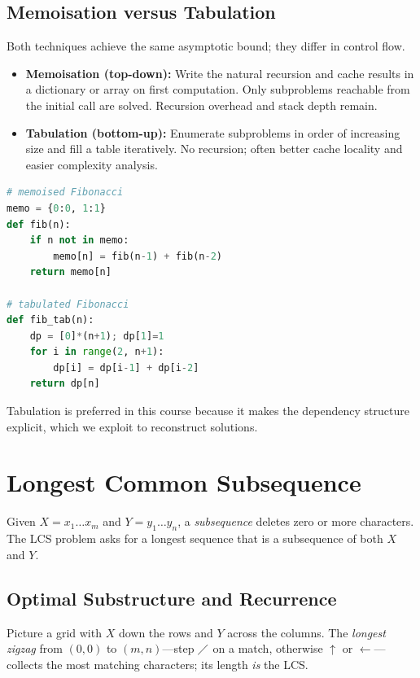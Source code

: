 \subsection{Memoisation versus Tabulation}

Both techniques achieve the same asymptotic bound; they differ in control flow.

\begin{itemize}
    \item \textbf{Memoisation (top-down):} Write the natural recursion and cache results in a dictionary or array on first computation. Only subproblems reachable from the initial call are solved. Recursion overhead and stack depth remain.
    \item \textbf{Tabulation (bottom-up):} Enumerate subproblems in order of increasing size and fill a table iteratively. No recursion; often better cache locality and easier complexity analysis.
\end{itemize}

\begin{lstlisting}[language=Python]
# memoised Fibonacci
memo = {0:0, 1:1}
def fib(n):
    if n not in memo:
        memo[n] = fib(n-1) + fib(n-2)
    return memo[n]

# tabulated Fibonacci
def fib_tab(n):
    dp = [0]*(n+1); dp[1]=1
    for i in range(2, n+1):
        dp[i] = dp[i-1] + dp[i-2]
    return dp[n]
\end{lstlisting}

Tabulation is preferred in this course because it makes the dependency structure explicit, which we exploit to reconstruct solutions.

\section{Longest Common Subsequence}
\label{sec:lcs}

Given $X = x_1\ldots x_m$ and $Y = y_1\ldots y_n$, a \emph{subsequence} deletes zero or more characters. The LCS problem asks for a longest sequence that is a subsequence of both $X$ and $Y$.

\subsection{Optimal Substructure and Recurrence}

Picture a grid with $X$ down the rows and $Y$ across the columns. The \emph{longest zigzag} from $(0,0)$ to $(m,n)$---step $\diagup$ on a match, otherwise $\uparrow$ or $\leftarrow$---collects the most matching characters; its length \emph{is} the LCS.

